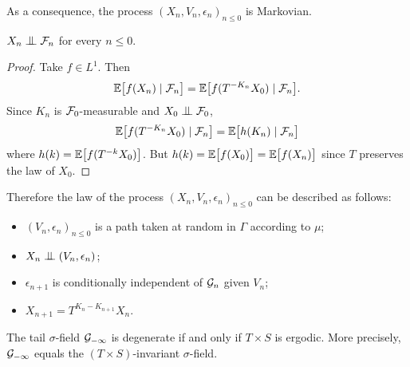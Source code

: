 \documentclass[12pt,a4paper]{article}
\begin{document}
As a consequence, the process ${(X_n, V_n, \epsilon_n)}_{n \leq 0}$ is Markovian. 


\begin{lemma}\label{lemma:independence}
$X_n \indep \FF_n$ for every $n \leq 0$.
\end{lemma}

\begin{proof}
Take $f \in L^1$. Then
$$
\mathbb{E}\bigl[ f(X_n) \mid \mathcal{F}_n\bigr] 
= \mathbb{E}\bigl[ f(T^{-K_n}X_0) \mid \mathcal{F}_n\bigr]. 
$$
Since $K_n$ is $\mathcal{F}_0$-measurable and $X_0 \indep \FF_0$, 
$$
\mathbb{E}\bigl[ f(T^{-K_n}X_0) \mid \mathcal{F}_n\bigr] = 
\mathbb{E}\bigl[ h(K_n) \mid \mathcal{F}_n\bigr]
$$
where $h(k) = \mathbb{E}\bigl[ f(T^{-k}X_0)\bigr]$. 
But $h(k) =   \mathbb{E}\bigl[ f(X_0)\bigr]=  \mathbb{E}\bigl[ f(X_n)\bigr]$ 
since $T$ preserves the law of $X_0$. 
\end{proof}

Therefore the law of the process ${(X_n,V_n,\epsilon_n)}_{n \leq 0}$ can 
be described as follows:
\begin{itemize}
\item ${(V_n,\epsilon_n)}_{n \leq 0}$ is a path taken at random in $\Gamma$ 
according to $\mu$;

\item $X_n \indep (V_n,\epsilon_n)$;

\item $\epsilon_{n+1}$ is conditionally independent of $\mathcal{G}_n$ given $V_n$;

\item $X_{n+1} = T^{K_n-K_{n+1}}X_n$.
\end{itemize}


\begin{ppsition}\label{ppsition:tailfield}
The tail $\sigma$-field $\mathcal{G}_{-\infty}$ is degenerate if and only if $T \times S$ is ergodic. 
More precisely, $\mathcal{G}_{-\infty}$ equals  the $(T\times S)$-invariant $\sigma$-field. 
\end{ppsition}
 
\end{document}
